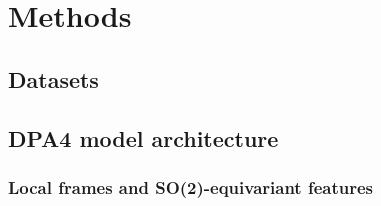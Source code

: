 \documentclass[fleqn,12pt]{wlscirep}
\begin{document}

\section{Methods}
\label{sec:methods}

\subsection{Datasets}


\subsection{DPA4 model architecture}



\subsubsection{Local frames and SO(2)-equivariant features}

\end{document}
